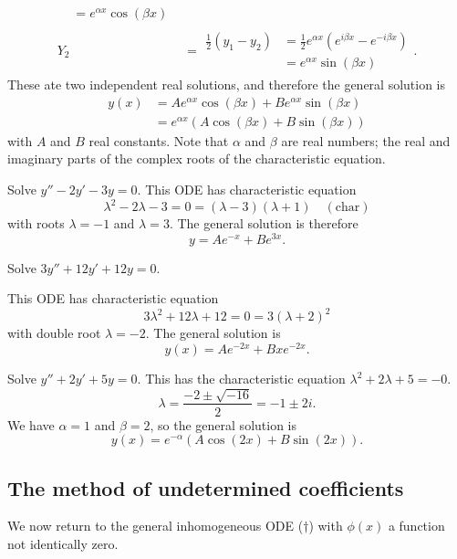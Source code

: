 \documentclass[10pt, a4paper]{article}
\begin{document}
\begin{enumerate}[label = \roman*)]
\begin{align*}
\begin{aligned}
            &= e ^ {\alpha x}\cos(\beta x) 
        \end{aligned} \\
        Y_2 &=
        \begin{aligned}
            \frac{1}{2}(y_1 - y_2) &= \frac{1}{2}e ^ {\alpha x}(e ^ {i\beta x} - e ^ {-i\beta x}) \\
            &= e ^ {\alpha x}\sin(\beta x) 
        \end{aligned}.
    \end{align*}
    These ate two independent real solutions,
    and therefore the general solution is
    \begin{align*}
        y(x) &= Ae ^ {\alpha x}\cos(\beta x) + Be ^ {\alpha x}\sin(\beta x) \\
        &= e ^ {\alpha x}(A\cos(\beta x) + B\sin(\beta x))
    \end{align*}
    with $A$ and $B$ real constants.
    Note that $\alpha$ and $\beta$ are real numbers;
    the real and imaginary parts of the complex roots of the characteristic equation.
\end{enumerate}

\begin{example}
    Solve $y'' - 2y' - 3y = 0$.
    This ODE has characteristic equation
    \[
    \lambda ^ 2 - 2\lambda - 3 = 0 = (\lambda - 3)(\lambda + 1)\quad(\text{char})
    \]
    with roots $\lambda = -1$ and $\lambda = 3$.
    The general solution is therefore
    \[
    y = Ae ^ {-x} + Be ^ {3x}.
    \]
\end{example}

\begin{example}
    Solve $3y'' + 12y' + 12y = 0$.

    This ODE has characteristic equation
    \[
    3\lambda ^ 2 + 12\lambda + 12 = 0 = 3(\lambda + 2) ^ 2
    \]
    with double root $\lambda = -2$.
    The general solution is
    \[
    y(x) = Ae ^ {-2x} + Bxe ^ {-2x}.
    \]
\end{example}

\begin{example}
    Solve $y'' + 2y' + 5y = 0$.
    This has the characteristic equation $\lambda ^ 2 + 2\lambda + 5 = -0$.
    \[
    \lambda = \frac{-2 \pm \sqrt{-16}}{2} = -1 \pm 2i.
    \]
    We have $\alpha = 1$ and $\beta = 2$,
    so the general solution is
    \[
    y(x) = e ^ {-\alpha}(A\cos(2x) + B\sin(2x)).
    \]
\end{example}

\subsection{The method of undetermined coefficients}
We now return to the general inhomogeneous ODE ($\dagger$) with $\phi(x)$ a function not identically zero.
\end{document}
